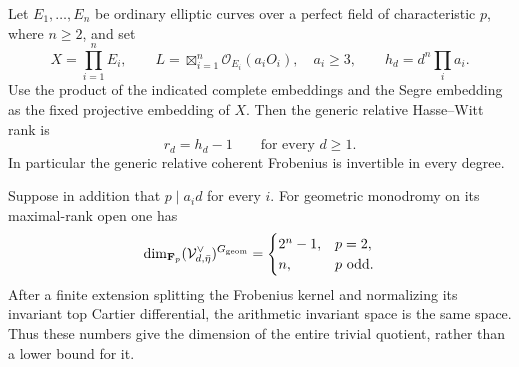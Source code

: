 \begin{theorem}\label{thm:product-exact-fixed-covectors}
Let $E_1,\ldots,E_n$ be ordinary elliptic curves over a
perfect field of characteristic $p$, where $n\geq2$, and set
\[
 X=\prod_{i=1}^nE_i,\qquad
 L=\boxtimes_{i=1}^n\mathcal O_{E_i}(a_iO_i),\quad a_i\geq3,
 \qquad h_d=d^n\prod_i a_i.
\]
Use the product of the indicated complete embeddings and
the Segre embedding as the fixed projective embedding of $X$.
Then the generic relative Hasse--Witt rank is
\begin{equation}\label{eq:product-elliptic-generic-rank}
 r_d=h_d-1\qquad\text{for every }d\geq1.
\end{equation}
In particular the generic relative coherent Frobenius is
invertible in every degree.

Suppose in addition that $p\mid a_i d$ for every $i$.
For geometric monodromy on its maximal-rank open one has
\begin{equation}\label{eq:product-entire-fixed-space}
 \dim_{\mathbf F_p}(\mathcal V_{d,\bar\eta}^{\vee})^{G_{\rm geom}}
 =\begin{cases}
       2^n-1,&p=2,\\
       n,&p\text{ odd}.
   \end{cases}
\end{equation}
After a finite extension splitting the Frobenius kernel
and normalizing its invariant top Cartier differential,
the arithmetic invariant space is the same space.
Thus these numbers give the dimension of the entire
trivial quotient, rather than a lower bound for it.
\end{theorem}

